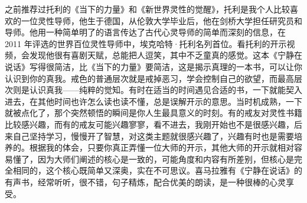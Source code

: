 \begin{book}
    之前推荐过托利的《当下的力量》和《新世界灵性的觉醒》，托利是我个人比较喜欢的一位灵性导师，他生于德国，从伦敦大学毕业后，他在剑桥大学担任研究员和导师。他用一种简单明了的语言传达了古代心灵导师的简单而深刻的信息，在 2011 年评选的世界百位灵性导师中，埃克哈特·托利名列首位。看托利的开示视频，会发现他很有喜剧天赋，总能把人逗笑，其中不乏童真的感觉。这本《宁静在说话》写得很简洁，比《当下的力量》要简洁，这是揭示真理的一本书，可以让你认识到你的真我。戒色的普通层次就是戒掉恶习，学会控制自己的欲望，而最高层次则是认识真我——纯粹的觉知。有时在适当的时间遇见合适的书，一下就能契入进去，在其他时间也许怎么读也读不懂，总是误解开示的意思。当时机成熟，一下就被点化了，那个突然顿悟的瞬间是你人生最具意义的时刻。有的戒友对灵性书籍比较感兴趣，而有的戒友可能兴趣寥寥，看不进去，我刚开始也不是很感兴趣，后来自己坚持学习，慢慢开了智慧，对这类主题就很感兴趣了，兴趣有时也是需要培养的。根据我的体会，只要你真正弄懂一位大师的开示，其他大师的开示就相对容易懂了，因为大师们阐述的核心是一致的，可能角度和内容有所差别，但核心是完全相同的，这个核心既简单又深奥，实在不可思议。喜马拉雅有《宁静在说话》的有声书，经常听听，很不错，句子精炼，配合优美的朗读，是一种很棒的心灵享受。
\end{book}

